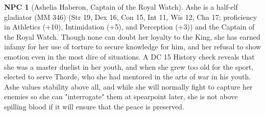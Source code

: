 \documentclass{report}
\theoremstyle{definition}
\newtheorem{npc}{NPC}[chapter]
\begin{document}
\begin{npc}[Ashelia Haberon, Captain of the Royal Watch]
Ashe is a half-elf gladiator (MM 346) (Str 19, Dex 16, Con 15, Int 11, Wis 12, Cha 17; proficiency in Athletics (+10), Intimidation (+5), and Perception (+3)) and the Captain of the Royal Watch. Though none can doubt her loyalty to the King, she has earned infamy for her use of torture to secure knowledge for him, and her refusal to show emotion even in the most dire of situations.  A DC 15 History check reveals that she was a master duelist in her youth, and when she grew too old for the sport, elected to serve Thorde, who she had mentored in the arts of war in his youth. Ashe values stability above all, and while she will normally fight to capture her enemies so she can "interrogate" them at spearpoint later, she is not above spilling blood if it will ensure that the peace is preserved.
\end{npc}
\end{document}
